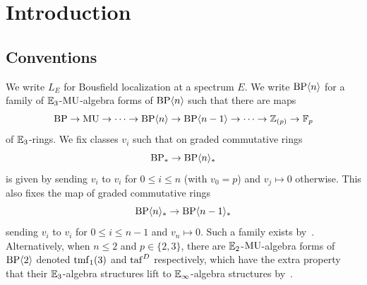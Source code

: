 
\section{Introduction}





\subsection{Conventions}
We write $L_{E}$ for Bousfield localization at a spectrum $E$. We write $\mathrm{BP}\langle n\rangle$ for a family of $\mathbb{E}_3$-$\mathrm{MU}$-algebra forms of $\mathrm{BP}\langle n\rangle$ such that there are maps
\[
\mathrm{BP}\to \mathrm{MU} \to  \dots \to \mathrm{BP}\langle n\rangle\to  \mathrm{BP}\langle n-1\rangle\to  \dots  \to \mathbb{Z}_{(p)}\to \mathbb{F}_{p}
\]
of $\mathbb{E}_3$-rings. 
We fix classes $v_i$ such that on graded commutative rings
\[
\mathrm{BP}_*\to  \mathrm{BP}\langle n\rangle_*
\]
is given by sending $v_i$ to $v_i$ for $0\le i\le n$ (with $v_0=p$) and $v_j\mapsto 0$ otherwise. 
This also fixes the map of graded commutative rings 
\[  
    \mathrm{BP}\langle n\rangle_*\to  \mathrm{BP}\langle n-1\rangle_*
\]
sending $v_i$ to $v_i$ for $0\le i\le n-1$ and $v_n\mapsto 0$. Such a family exists by~\cite[Theorem~A]{HW22}. 
Alternatively, when $n\le 2$ and $p\in \{2,3\}$, there are $\mathbb{E}_2$-$\mathrm{MU}$-algebra forms of $\mathrm{BP}\langle 2\rangle$ denoted $\mathrm{tmf}_1(3)$ and $\mathrm{taf}^{D}$ respectively, which have the extra property that their $\mathbb{E}_3$-algebra structures lift to $\mathbb{E}_\infty$-algebra structures by~\cite{HL10,LN12,LN14,CM15}. 
